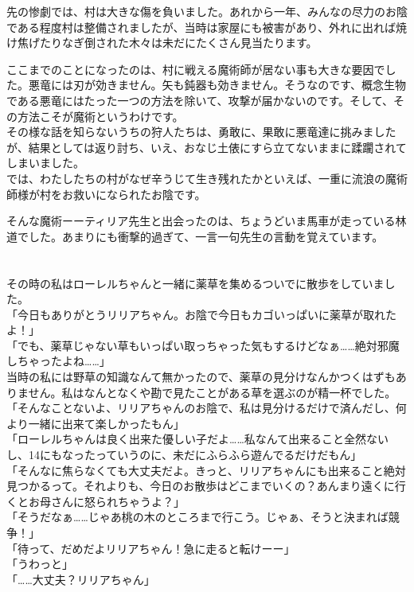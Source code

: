 \documentclass[oneside, a4paper]{jsbook}
\begin{document}
先の惨劇では、村は大きな傷を負いました。あれから一年、みんなの尽力のお陰である程度村は整備されましたが、当時は家屋にも被害があり、外れに出れば焼け焦げたりなぎ倒された木々は未だにたくさん見当たります。

ここまでのことになったのは、村に戦える魔術師が居ない事も大きな要因でした。悪竜には刃が効きません。矢も鈍器も効きません。そうなのです、概念生物である悪竜にはたった一つの方法を除いて、攻撃が届かないのです。そして、その方法こそが魔術というわけです。\\

その様な話を知らないうちの狩人たちは、勇敢に、果敢に悪竜達に挑みましたが、結果としては返り討ち、いえ、おなじ土俵にすら立てないままに蹂躙されてしまいました。\\

では、わたしたちの村がなぜ辛うじて生き残れたかといえば、一重に流浪の魔術師様が村をお救いになられたお陰です。

そんな魔術ーーティリア先生と出会ったのは、ちょうどいま馬車が走っている林道でした。あまりにも衝撃的過ぎて、一言一句先生の言動を覚えています。\\\\\\

その時の私はローレルちゃんと一緒に薬草を集めるついでに散歩をしていました。\\

\noindent
「今日もありがとうリリアちゃん。お陰で今日もカゴいっぱいに薬草が取れたよ！」\\
「でも、薬草じゃない草もいっぱい取っちゃった気もするけどなぁ……絶対邪魔しちゃったよね……」\\

当時の私には野草の知識なんて無かったので、薬草の見分けなんかつくはずもありません。私はなんとなくや勘で見たことがある草を選ぶのが精一杯でした。\\

\noindent
「そんなことないよ、リリアちゃんのお陰で、私は見分けるだけで済んだし、何より一緒に出来て楽しかったもん」\\
「ローレルちゃんは良く出来た優しい子だよ……私なんて出来ること全然ないし、14にもなったっていうのに、未だにふらふら遊んでるだけだもん」\\
「そんなに焦らなくても大丈夫だよ。きっと、リリアちゃんにも出来ること絶対見つかるって。それよりも、今日のお散歩はどこまでいくの？あんまり遠くに行くとお母さんに怒られちゃうよ？」\\
「そうだなぁ……じゃあ桃の木のところまで行こう。じゃぁ、そうと決まれば競争！」\\
「待って、だめだよリリアちゃん！急に走ると転けーー」\\
「うわっと」\\
「……大丈夫？リリアちゃん」\\
\end{document}
